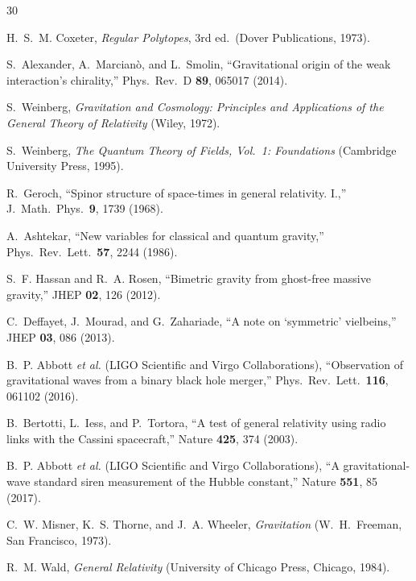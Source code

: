 \documentclass[aps,prd,preprint,superscriptaddress,showpacs,preprintnumbers,amsmath,amssymb,nofootinbib]{revtex4-2}
\begin{document}
\begin{thebibliography}{30}

H.~S.~M. Coxeter, \emph{Regular Polytopes}, 3rd ed.\ (Dover Publications, 1973).

S.~Alexander, A.~Marcian\`o, and L.~Smolin, ``Gravitational origin of the weak interaction's chirality,'' Phys.\ Rev.\ D \textbf{89}, 065017 (2014).

S.~Weinberg, \emph{Gravitation and Cosmology: Principles and Applications of the General Theory of Relativity} (Wiley, 1972).

S.~Weinberg, \emph{The Quantum Theory of Fields, Vol.\ 1: Foundations} (Cambridge University Press, 1995).

R.~Geroch, ``Spinor structure of space-times in general relativity. I.,'' J.\ Math.\ Phys.\ \textbf{9}, 1739 (1968).

A.~Ashtekar, ``New variables for classical and quantum gravity,'' Phys.\ Rev.\ Lett.\ \textbf{57}, 2244 (1986).

S.~F. Hassan and R.~A. Rosen, ``Bimetric gravity from ghost-free massive gravity,'' JHEP \textbf{02}, 126 (2012).

C.~Deffayet, J.~Mourad, and G.~Zahariade, ``A note on `symmetric' vielbeins,'' JHEP \textbf{03}, 086 (2013).

B.~P. Abbott \textit{et al.} (LIGO Scientific and Virgo Collaborations), ``Observation of gravitational waves from a binary black hole merger,'' Phys.\ Rev.\ Lett.\ \textbf{116}, 061102 (2016).

B.~Bertotti, L.~Iess, and P.~Tortora, ``A test of general relativity using radio links with the Cassini spacecraft,'' Nature \textbf{425}, 374 (2003).

B.~P. Abbott \textit{et al.} (LIGO Scientific and Virgo Collaborations), ``A gravitational-wave standard siren measurement of the Hubble constant,'' Nature \textbf{551}, 85 (2017).

C.~W. Misner, K.~S. Thorne, and J.~A. Wheeler, \emph{Gravitation} (W.~H.~Freeman, San Francisco, 1973).

R.~M. Wald, \emph{General Relativity} (University of Chicago Press, Chicago, 1984).


\end{thebibliography}
\end{document}
